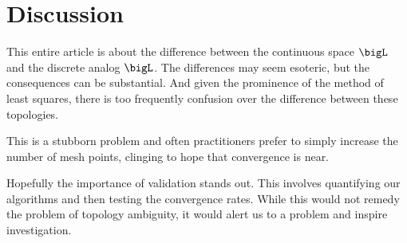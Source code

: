 \section{Discussion}
This entire article is about the difference between the continuous space $\bigL$ and the discrete analog $\bigL$. The differences may seem esoteric, but the consequences can be substantial. And given the prominence of the method of least squares, there is too frequently confusion over the difference between these topologies.

This is a stubborn problem and often practitioners prefer to simply increase the number of mesh points, clinging to hope that convergence is near. 

Hopefully the importance of validation stands out. This involves quantifying our algorithms and then testing the convergence rates. While this would not remedy the problem of topology ambiguity, it would alert us to a problem and inspire investigation.

\endinput %